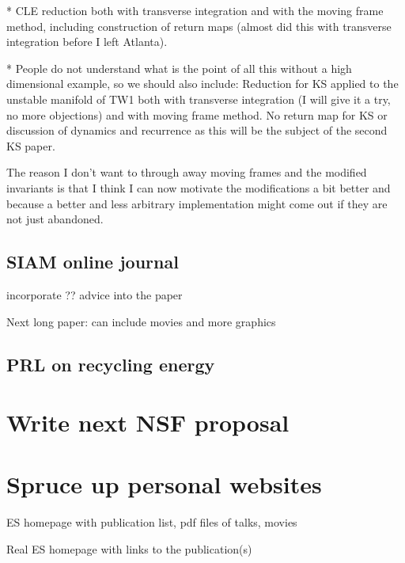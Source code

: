 * CLE reduction both with transverse integration and with the
moving frame method, including construction of return maps
(almost did this with transverse integration before I left
Atlanta).

* People do not understand what is the point of all this
without a high dimensional example, so we should also
include: Reduction for KS applied to the unstable manifold of
TW1 both with transverse integration (I will give it a try,
no more objections) and with moving frame method. No return
map for KS or discussion of dynamics and recurrence as this
will be the subject of the second KS paper.

The reason I don't want to through away moving frames and the
modified invariants is that I think I can now motivate the
modifications a bit better and because a better and less
arbitrary implementation might come out if they are not just
abandoned.

\subsection{SIAM online journal}

incorporate ?? advice into the paper

Next long paper: can include movies and more graphics

\subsection{PRL on recycling energy}

\section{Write next NSF proposal }

\section{Spruce up personal websites}

ES homepage with publication list, pdf files of talks, movies

Real ES homepage with links to the publication(s)
